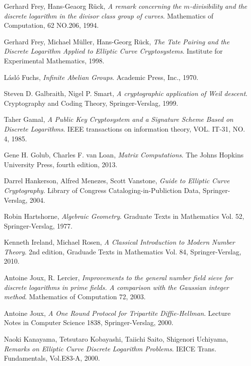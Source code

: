 \documentclass{article}
\numberwithin{equation}{section}
\theoremstyle{definition}
\begin{document}
\begin{thebibliography}{9}
  Gerhard Frey,
  Hans-Geaorg R\"uck,
  \emph{A remark concerning the $m$-divisibility and the discrete logarithm in the divisor class group of curves}.
  Mathematics of Computation, 
  62 NO.206,
  1994.
  
  Gerhard Frey,
  Michael M\"uller,
  Hans-Georg R\"uck,
  \emph{The Tate Pairing and the Discrete Logarithm Applied to Elliptic Curve Cryptosystems}.
  Institute for Experimental Mathematics,
  1998.
  
  L\'asl\'o Fuchs,
  \emph{Infinite Abelian Groups}.
  Academic Press, Inc.,
  1970.

  Steven D. Galbraith,
  Nigel P. Smart,
  \emph{A cryptographic application of Weil descent}.
  Cryptography and Coding Theory,
  Springer-Verslag,
  1999.


  Taher Gamal,
  \emph{A Public Key Cryptosystem and a Signature Scheme Based on Discrete Logarithms}.
  IEEE transactions on information theory,
  VOL. IT-31,
  NO. 4,
  1985.

  Gene H. Golub,
  Charles F. van Loan,
  \emph{Matrix Computations}.
  The Johns Hopkins University Press,
  fourth edition,
  2013.

  Darrel Hankerson,
  Alfred Menezes,
  Scott Vanstone,
  \emph{Guide to Elliptic Curve Cryptography}.
  Library of Congress Cataloging-in-Publiction Data,
  Springer-Verslag,
  2004.

  Robin Hartshorne,
  \emph{Algebraic Geometry}.
  Graduate Texts in Mathematics Vol. 52,
  Springer-Verslag,
  1977.

  Kenneth Ireland,
  Michael Rosen,
  \emph{A Classical Introduction to Modern Number Theory}.
  2nd edition,
  Graduade Texts in Mathematics Vol. 84,
  Springer-Verslag,
  2010.

  Antoine Joux,
  R. Lercier,
  \emph{Improvements to the general number field sieve for discrete logarithms in prime fields. A comparison   with the Gaussian integer method}.
  Mathematics of Computation 72,
  2003.

  Antoine Joux,
  \emph{A One Round Protocol for Tripartite Diffie-Hellman}.
  Lecture Notes in Computer Science 1838,
  Springer-Verslag,
  2000.

  Naoki Kanayama,
  Tetsutaro Kobayashi,
  Taiichi Saito,
  Shigenori Uchiyama,
  \emph{Remarks on Elliptic Curve Discrete Logarithm Problems}.
  IEICE Trans. Fundamentals,
  Vol.E83-A,
  2000.


\end{thebibliography}
\end{document}
